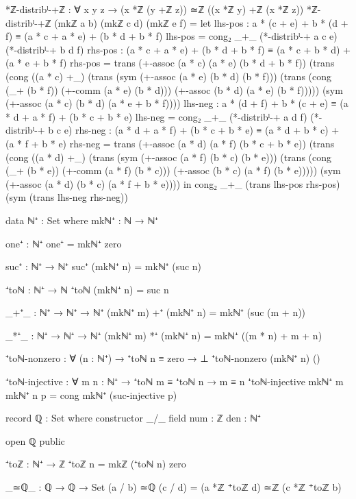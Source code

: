 \documentclass[11pt,a4paper]{book}
\begin{document}
\begin{code}
*ℤ-distribˡ-+ℤ : ∀ x y z → (x *ℤ (y +ℤ z)) ≃ℤ ((x *ℤ y) +ℤ (x *ℤ z))
*ℤ-distribˡ-+ℤ (mkℤ a b) (mkℤ c d) (mkℤ e f) = 
  let
      lhs-pos : a * (c + e) + b * (d + f) ≡ (a * c + a * e) + (b * d + b * f)
      lhs-pos = cong₂ _+_ (*-distribˡ-+ a c e) (*-distribˡ-+ b d f)
      rhs-pos : (a * c + a * e) + (b * d + b * f) ≡ (a * c + b * d) + (a * e + b * f)
      rhs-pos = trans (+-assoc (a * c) (a * e) (b * d + b * f))
                (trans (cong ((a * c) +_) (trans (sym (+-assoc (a * e) (b * d) (b * f)))
                                          (trans (cong (_+ (b * f)) (+-comm (a * e) (b * d)))
                                                 (+-assoc (b * d) (a * e) (b * f)))))
                       (sym (+-assoc (a * c) (b * d) (a * e + b * f))))
      lhs-neg : a * (d + f) + b * (c + e) ≡ (a * d + a * f) + (b * c + b * e)
      lhs-neg = cong₂ _+_ (*-distribˡ-+ a d f) (*-distribˡ-+ b c e)
      rhs-neg : (a * d + a * f) + (b * c + b * e) ≡ (a * d + b * c) + (a * f + b * e)
      rhs-neg = trans (+-assoc (a * d) (a * f) (b * c + b * e))
                (trans (cong ((a * d) +_) (trans (sym (+-assoc (a * f) (b * c) (b * e)))
                                          (trans (cong (_+ (b * e)) (+-comm (a * f) (b * c)))
                                                 (+-assoc (b * c) (a * f) (b * e)))))
                       (sym (+-assoc (a * d) (b * c) (a * f + b * e))))
  in cong₂ _+_ (trans lhs-pos rhs-pos) (sym (trans lhs-neg rhs-neg))

data ℕ⁺ : Set where
  mkℕ⁺ : ℕ → ℕ⁺

one⁺ : ℕ⁺
one⁺ = mkℕ⁺ zero

suc⁺ : ℕ⁺ → ℕ⁺
suc⁺ (mkℕ⁺ n) = mkℕ⁺ (suc n)

⁺toℕ : ℕ⁺ → ℕ
⁺toℕ (mkℕ⁺ n) = suc n

_+⁺_ : ℕ⁺ → ℕ⁺ → ℕ⁺
(mkℕ⁺ m) +⁺ (mkℕ⁺ n) = mkℕ⁺ (suc (m + n))

_*⁺_ : ℕ⁺ → ℕ⁺ → ℕ⁺
(mkℕ⁺ m) *⁺ (mkℕ⁺ n) = mkℕ⁺ ((m * n) + m + n)

⁺toℕ-nonzero : ∀ (n : ℕ⁺) → ⁺toℕ n ≡ zero → ⊥
⁺toℕ-nonzero (mkℕ⁺ n) ()

⁺toℕ-injective : ∀ {m n : ℕ⁺} → ⁺toℕ m ≡ ⁺toℕ n → m ≡ n
⁺toℕ-injective {mkℕ⁺ m} {mkℕ⁺ n} p = cong mkℕ⁺ (suc-injective p)

record ℚ : Set where
  constructor _/_
  field
    num : ℤ
    den : ℕ⁺

open ℚ public

⁺toℤ : ℕ⁺ → ℤ
⁺toℤ n = mkℤ (⁺toℕ n) zero

_≃ℚ_ : ℚ → ℚ → Set
(a / b) ≃ℚ (c / d) = (a *ℤ ⁺toℤ d) ≃ℤ (c *ℤ ⁺toℤ b)


\end{code}
\end{document}
